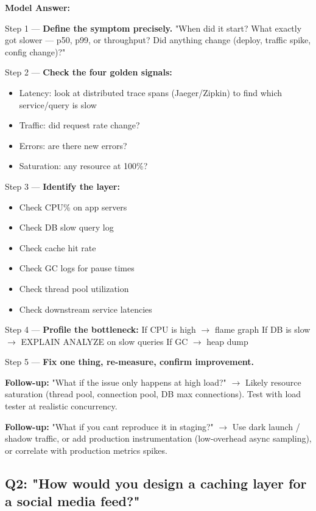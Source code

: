 \documentclass[11pt]{article}
\providecommand{\tightlist}{\setlength{\itemsep}{1pt}\setlength{\parskip}{0pt}}
\begin{document}
\textbf{Model Answer:}

Step 1 --- \textbf{Define the symptom precisely.}
"When did it start? What exactly got slower --- p50, p99, or throughput? Did anything change (deploy, traffic spike, config change)?"

Step 2 --- \textbf{Check the four golden signals:}

\begin{itemize}
\tightlist
\item
  Latency: look at distributed trace spans (Jaeger/Zipkin) to find which service/query is slow
\item
  Traffic: did request rate change?
\item
  Errors: are there new errors?
\item
  Saturation: any resource at 100\%?
\end{itemize}

Step 3 --- \textbf{Identify the layer:}

\begin{itemize}
\tightlist
\item
  Check CPU\% on app servers
\item
  Check DB slow query log
\item
  Check cache hit rate
\item
  Check GC logs for pause times
\item
  Check thread pool utilization
\item
  Check downstream service latencies
\end{itemize}

Step 4 --- \textbf{Profile the bottleneck:}
If CPU is high \(\rightarrow\) flame graph
If DB is slow \(\rightarrow\) EXPLAIN ANALYZE on slow queries
If GC \(\rightarrow\) heap dump

Step 5 --- \textbf{Fix one thing, re-measure, confirm improvement.}

\textbf{Follow-up:} "What if the issue only happens at high load?"
\(\rightarrow\) Likely resource saturation (thread pool, connection pool, DB max connections). Test with load tester at realistic concurrency.

\textbf{Follow-up:} "What if you can\textquotesingle t reproduce it in staging?"
\(\rightarrow\) Use dark launch / shadow traffic, or add production instrumentation (low-overhead async sampling), or correlate with production metrics spikes.

\subsection{Q2: "How would you design a caching layer for a social media feed?"}\label{q2-how-would-you-design-a-caching-layer-for-a-social-media-feed}
\end{document}
